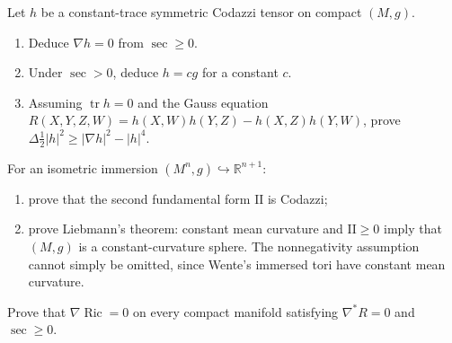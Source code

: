 \begin{remark}
  \label{rem:pet-ch9-exercise-9-6-11}
  Let $h$ be a constant-trace symmetric Codazzi tensor on compact $(M,g)$.
  \begin{enumerate}
    \item[(1)] Deduce $\nabla h=0$ from $\sec\ge0$.
    \item[(2)] Under $\sec>0$, deduce $h=cg$ for a constant $c$.
    \item[(3)] Assuming $\operatorname{tr}h=0$ and the Gauss equation
      $R(X,Y,Z,W)=h(X,W)h(Y,Z)-h(X,Z)h(Y,W)$, prove
      $\Delta\tfrac12|h|^2\ge|\nabla h|^2-|h|^4$.
  \end{enumerate}
\end{remark}

\begin{remark}
  \label{rem:pet-ch9-exercise-9-6-12}
  For an isometric immersion $(M^n,g)\hookrightarrow\mathbb R^{n+1}$:
  \begin{enumerate}
    \item[(1)] prove that the second fundamental form $\mathrm{II}$ is
      Codazzi;
    \item[(2)] prove Liebmann's theorem: constant mean curvature and
      $\mathrm{II}\ge0$ imply that $(M,g)$ is a constant-curvature sphere.
      The nonnegativity assumption cannot simply be omitted, since Wente's
      immersed tori have constant mean curvature.
  \end{enumerate}
\end{remark}

\begin{remark}
  \label{rem:pet-ch9-exercise-9-6-13}
  Prove that $\nabla\operatorname{Ric}=0$ on every compact manifold satisfying
  $\nabla^*R=0$ and $\sec\ge0$.
\end{remark}

